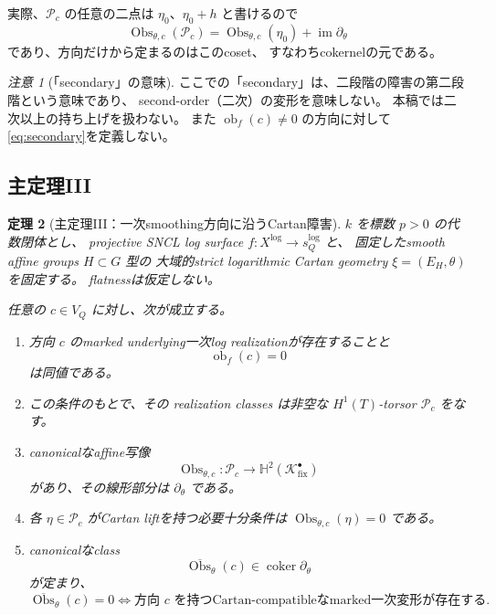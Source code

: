 \documentclass[uplatex,dvipdfmx,11pt]{jsarticle}
\numberwithin{equation}{section}
\theoremstyle{plain}
\newtheorem{theorem}{定理}[section]
\theoremstyle{definition}
\theoremstyle{remark}
\newtheorem{remark}[theorem]{注意}
\DeclareMathOperator{\coker}{coker}
\DeclareMathOperator{\im}{im}
\DeclareMathOperator{\Obs}{Obs}
\DeclareMathOperator{\obf}{ob}
\newcommand{\sQ}{s_Q^{\log}}
\newcommand{\Xlog}{X^{\log}}
\newcommand{\Kfix}{\mathcal K_{\mathrm{fix}}^\bullet}
\newcommand{\Hyp}{\mathbb H}
\begin{document}
実際、\(\mathcal P_c\) の任意の二点は \(\eta_0\)、\(\eta_0+h\) と書けるので
\begin{equation}
\label{eq:coset}
\Obs_{\theta,c}(\mathcal P_c)
=\Obs_{\theta,c}(\eta_0)+\im\partial_\theta
\end{equation}
であり、方向だけから定まるのはこのcoset、
すなわちcokernelの元である。

\begin{remark}[「secondary」の意味]
\label{rem:secondary-meaning}
ここでの「secondary」は、二段階の障害の第二段階という意味であり、
second-order（二次）の変形を意味しない。
本稿では二次以上の持ち上げを扱わない。
また \(\obf_f(c)\ne0\) の方向に対して\eqref{eq:secondary}を定義しない。
\end{remark}

\subsection{主定理III}

\begin{theorem}[主定理III：一次smoothing方向に沿うCartan障害]
\label{thm:first-order-cartan-obstruction}
\(k\) を標数 \(p>0\) の代数閉体とし、
projective SNCL log surface \(f:\Xlog\to\sQ\) と、
固定したsmooth affine groups \(H\subset G\) 型の
大域的strict logarithmic Cartan geometry \(\xi=(E_H,\theta)\) を固定する。
flatnessは仮定しない。

任意の \(c\in V_Q\) に対し、次が成立する。
\begin{enumerate}
\item
方向 \(c\) のmarked underlying一次log realizationが存在することと
\[
\obf_f(c)=0
\]
は同値である。

\item
この条件のもとで、その realization classes は非空な
\(H^1(T)\)-torsor \(\mathcal P_c\) をなす。

\item
canonicalなaffine写像
\[
\Obs_{\theta,c}:\mathcal P_c\longrightarrow\Hyp^2(\Kfix)
\]
があり、その線形部分は \(\partial_\theta\) である。

\item
各 \(\eta\in\mathcal P_c\) がCartan liftを持つ必要十分条件は
\(\Obs_{\theta,c}(\eta)=0\) である。

\item
canonicalなclass
\[
\overline{\Obs}_\theta(c)\in\coker\partial_\theta
\]
が定まり、
\[
\overline{\Obs}_\theta(c)=0
\iff
\text{方向 }c\text{ を持つCartan-compatibleなmarked一次変形が存在する}.
\]
\end{enumerate}
\end{theorem}
\end{document}
